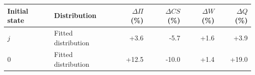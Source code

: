 \begin{tabular}{llrrrr}\toprule
Initial state & Distribution & $\Delta\Pi$ (\%) & $\Delta CS$ (\%) & $\Delta W$ (\%) & $\Delta Q$ (\%)\\\midrule
$j$ & Fitted distribution & +3.6 & -5.7 & +1.6 & +3.9 \\
$0$ & Fitted distribution & +12.5 & -10.0 & +1.4 & +19.0 \\
\bottomrule\end{tabular}
